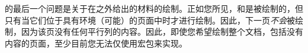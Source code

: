 
\bgpaint{}的最后一个问题是关于在之外给出的材料的绘制。正如您所见，\Preenv{}和\postenv{}是被绘制的，但只有当它们位于具有环境（可能）的页面中时才进行绘制。因此，下一页\emph{不会}被绘制，因为该页没有任何平行列的内容。因此，即使您希望绘制整个文档，包括没有内容的页面，至少目前您无法仅使用\Paracol{}宏包来实现。
% 

